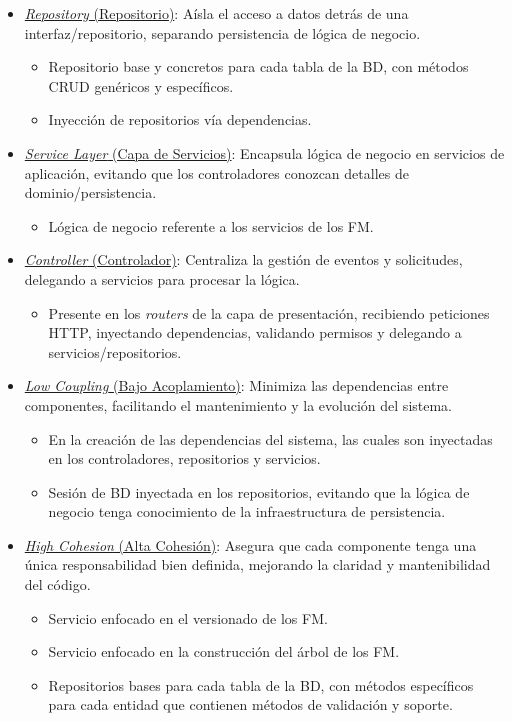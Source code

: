 \begin{itemize}
	\item \underline{\textit{Repository} (Repositorio)}: Aísla el acceso a datos detrás de una interfaz/repositorio, separando persistencia de lógica de negocio.
	\begin{itemize}
		\item Repositorio base y concretos para cada tabla de la \ac{BD}, con métodos \ac{CRUD} genéricos y específicos.
		\item Inyección de repositorios vía dependencias.
	\end{itemize} 
	\item \underline{\textit{Service Layer} (Capa de Servicios)}: Encapsula lógica de negocio en servicios de aplicación, evitando que los controladores conozcan detalles de dominio/persistencia.
	\begin{itemize}
		\item Lógica de negocio referente a los servicios de los \ac{FM}.
	\end{itemize} 
	\item \underline{\textit{Controller} (Controlador)}: Centraliza la gestión de eventos y solicitudes, delegando a servicios para procesar la lógica.
	\begin{itemize}
		\item Presente en los \textit{routers} de la capa de presentación, recibiendo peticiones HTTP, inyectando dependencias, validando permisos y delegando a servicios/repositorios.
	\end{itemize} 
	\item \underline{\textit{Low Coupling} (Bajo Acoplamiento)}: Minimiza las dependencias entre componentes, facilitando el mantenimiento y la evolución del sistema.
	\begin{itemize}
		\item En la creación de las dependencias del sistema, las cuales son inyectadas en los controladores, repositorios y servicios.
		\item Sesión de \ac{BD} inyectada en los repositorios, evitando que la lógica de negocio tenga conocimiento de la infraestructura de persistencia.
	\end{itemize} 
	\item \underline{\textit{High Cohesion} (Alta Cohesión)}: Asegura que cada componente tenga una única responsabilidad bien definida, mejorando la claridad y mantenibilidad del código.
	\begin{itemize}
		\item Servicio enfocado en el versionado de los \ac{FM}.
		\item Servicio enfocado en la construcción del árbol de los \ac{FM}.
		\item Repositorios bases para cada tabla de la \ac{BD}, con métodos específicos para cada entidad que contienen métodos de validación y soporte.
	\end{itemize} 
\end{itemize}


